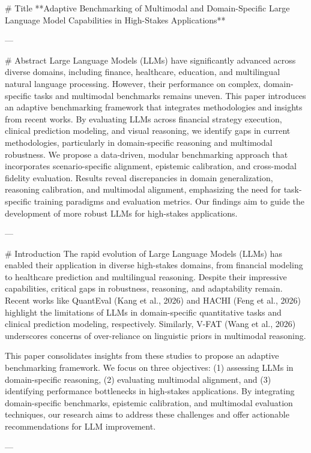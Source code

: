 # Title  
**Adaptive Benchmarking of Multimodal and Domain-Specific Large Language Model Capabilities in High-Stakes Applications**

---

# Abstract  
Large Language Models (LLMs) have significantly advanced across diverse domains, including finance, healthcare, education, and multilingual natural language processing. However, their performance on complex, domain-specific tasks and multimodal benchmarks remains uneven. This paper introduces an adaptive benchmarking framework that integrates methodologies and insights from recent works. By evaluating LLMs across financial strategy execution, clinical prediction modeling, and visual reasoning, we identify gaps in current methodologies, particularly in domain-specific reasoning and multimodal robustness. We propose a data-driven, modular benchmarking approach that incorporates scenario-specific alignment, epistemic calibration, and cross-modal fidelity evaluation. Results reveal discrepancies in domain generalization, reasoning calibration, and multimodal alignment, emphasizing the need for task-specific training paradigms and evaluation metrics. Our findings aim to guide the development of more robust LLMs for high-stakes applications.

---

# Introduction  
The rapid evolution of Large Language Models (LLMs) has enabled their application in diverse high-stakes domains, from financial modeling to healthcare prediction and multilingual reasoning. Despite their impressive capabilities, critical gaps in robustness, reasoning, and adaptability remain. Recent works like QuantEval (Kang et al., 2026) and HACHI (Feng et al., 2026) highlight the limitations of LLMs in domain-specific quantitative tasks and clinical prediction modeling, respectively. Similarly, V-FAT (Wang et al., 2026) underscores concerns of over-reliance on linguistic priors in multimodal reasoning. 

This paper consolidates insights from these studies to propose an adaptive benchmarking framework. We focus on three objectives: (1) assessing LLMs in domain-specific reasoning, (2) evaluating multimodal alignment, and (3) identifying performance bottlenecks in high-stakes applications. By integrating domain-specific benchmarks, epistemic calibration, and multimodal evaluation techniques, our research aims to address these challenges and offer actionable recommendations for LLM improvement.

---

